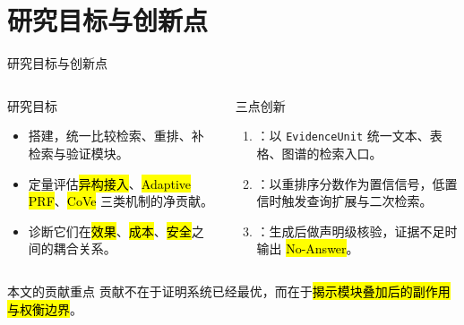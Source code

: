 \section{研究目标与创新点}

\begin{frame}{研究目标与创新点}
  \begin{columns}[T,onlytextwidth]
    \begin{block}{研究目标}
      \begin{itemize}
        \item 搭建，统一比较检索、重排、补检索与验证模块。
        \item 定量评估\hl{异构接入}、\hl{Adaptive PRF}、\hl{CoVe} 三类机制的净贡献。
        \item 诊断它们在\hl{效果}、\hl{成本}、\hl{安全}之间的耦合关系。
      \end{itemize}
    \end{block}

    \begin{block}{三点创新}
      \begin{enumerate}
        \item {}：以 \texttt{EvidenceUnit} 统一文本、表格、图谱的检索入口。
        \item {}：以重排序分数作为置信信号，低置信时触发查询扩展与二次检索。
        \item {}：生成后做声明级核验，证据不足时输出 \hl{No-Answer}。
      \end{enumerate}
    \end{block}
  \end{columns}

  \vspace{0.4em}
  \begin{alertblock}{本文的贡献重点}
    贡献不在于证明系统已经最优，而在于\hl{揭示模块叠加后的副作用与权衡边界}。
  \end{alertblock}
\end{frame}
